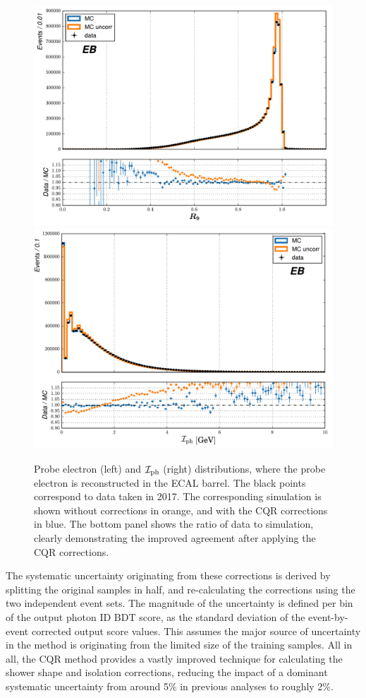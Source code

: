 \begin{figure}[htb!]
  \centering
  \includegraphics[width=.49\textwidth]{Figures/hgg_overview/dataMC_probeR9_0_corr.pdf}
  \includegraphics[width=.49\textwidth]{Figures/hgg_overview/dataMC_probePhoIso_0_corr.pdf}
  \caption[Corrections from the chained quantile regression method for \RNINE and $\mathcal{I}_{\rm{ph}}$]
  {
    Probe electron \RNINE (left) and $\mathcal{I}_{\rm{ph}}$ (right) distributions, where the probe electron is reconstructed in the ECAL barrel. The black points correspond to data taken in 2017. The corresponding simulation is shown without corrections in orange, and with the CQR corrections in blue. The bottom panel shows the ratio of data to simulation, clearly demonstrating the improved agreement after applying the CQR corrections.
  }
  \label{fig:photon_id_0}
\end{figure}

The systematic uncertainty originating from these corrections is derived by splitting the original \Zee samples in half, and re-calculating the corrections using the two independent event sets. The magnitude of the uncertainty is defined per bin of the output photon ID BDT score, as the standard deviation of the event-by-event corrected output score values. This assumes the major source of uncertainty in the method is originating from the limited size of the training samples. All in all, the CQR method provides a vastly improved technique for calculating the shower shape and isolation corrections, reducing the impact of a dominant systematic uncertainty from around 5\% in previous \Hgg analyses to roughly 2\%.

